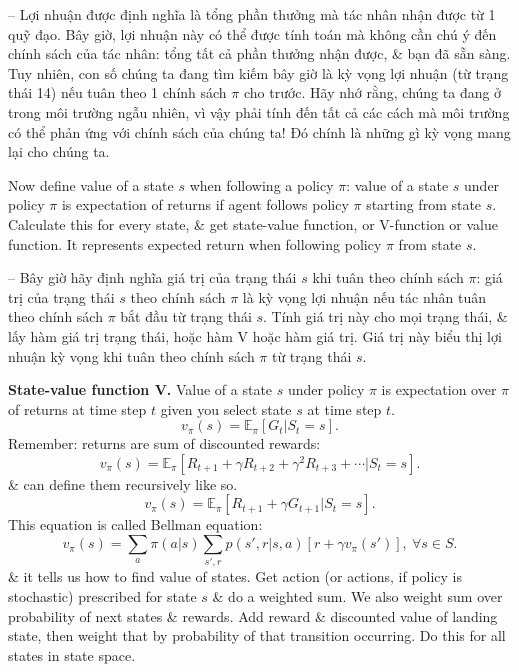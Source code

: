\documentclass{article}
\begin{document}
\begin{itemize}
\begin{itemize}
\begin{itemize}
            -- Lợi nhuận được định nghĩa là tổng phần thưởng mà tác nhân nhận được từ 1 quỹ đạo. Bây giờ, lợi nhuận này có thể được tính toán mà không cần chú ý đến chính sách của tác nhân: tổng tất cả phần thưởng nhận được, \& bạn đã sẵn sàng. Tuy nhiên, con số chúng ta đang tìm kiếm bây giờ là kỳ vọng lợi nhuận (từ trạng thái 14) nếu tuân theo 1 chính sách $\pi$ cho trước. Hãy nhớ rằng, chúng ta đang ở trong môi trường ngẫu nhiên, vì vậy phải tính đến tất cả các cách mà môi trường có thể phản ứng với chính sách của chúng ta! Đó chính là những gì kỳ vọng mang lại cho chúng ta.

            Now define value of a state $s$ when following a policy $\pi$: value of a state $s$ under policy $\pi$ is expectation of returns if agent follows policy $\pi$ starting from state $s$. Calculate this for every state, \& get state-value function, or V-function or value function. It represents expected return when following policy $\pi$ from state $s$.

            -- Bây giờ hãy định nghĩa giá trị của trạng thái $s$ khi tuân theo chính sách $\pi$: giá trị của trạng thái $s$ theo chính sách $\pi$ là kỳ vọng lợi nhuận nếu tác nhân tuân theo chính sách $\pi$ bắt đầu từ trạng thái $s$. Tính giá trị này cho mọi trạng thái, \& lấy hàm giá trị trạng thái, hoặc hàm V hoặc hàm giá trị. Giá trị này biểu thị lợi nhuận kỳ vọng khi tuân theo chính sách $\pi$ từ trạng thái $s$.

            {\bf State-value function V.} Value of a state $s$ under policy $\pi$ is expectation over $\pi$ of returns at time step $t$ given you select state $s$ at time step $t$.
            \begin{equation*}
                v_\pi(s) = \mathbb{E}_\pi[G_t|S_t = s].
            \end{equation*}
            Remember: returns are sum of discounted rewards:
            \begin{equation*}
                v_\pi(s) = \mathbb{E}_\pi[R_{t+1} + \gamma R_{t+2} + \gamma^2R_{t+3} + \cdots|S_t = s].
            \end{equation*}
            \& can define them recursively like so.
            \begin{equation*}
                v_\pi(s) = \mathbb{E}_\pi[R_{t+1} + \gamma G_{t+1}|S_t = s].
            \end{equation*}
            This equation is called Bellman equation:
            \begin{equation*}
                v_\pi(s) = \sum_a \pi(a|s)\sum_{s',r} p(s',r|s,a)[r + \gamma v_\pi(s')],\ \forall s\in S.
            \end{equation*}
            \& it tells us how to find value of states. Get action (or actions, if policy is stochastic) prescribed for state $s$ \& do a weighted sum. We also weight sum over probability of next states \& rewards. Add reward \& discounted value of landing state, then weight that by probability of that transition occurring. Do this for all states in state space.


\end{itemize}
\end{itemize}
\end{itemize}
\end{document}
